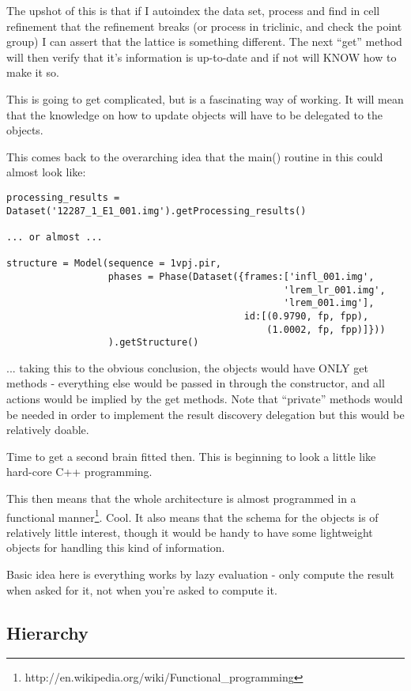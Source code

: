 \documentclass[a4paper, 11pt]{article}
\begin{document}
The upshot of this is that if I autoindex the data set, process and find in 
cell refinement that the refinement breaks (or process in triclinic, and
check the point group) I can assert that the lattice is something different.
The next ``get'' method will then verify that it's information is up-to-date
and if not will KNOW how to make it so.

This is going to get complicated, but is a fascinating way of working. 
It will mean that the knowledge on how to update objects will have to be
delegated to the objects.

This comes back to the overarching idea that the main() routine in this 
could almost look like:

{
\tiny
\begin{verbatim}
processing_results = Dataset('12287_1_E1_001.img').getProcessing_results()

... or almost ...

structure = Model(sequence = 1vpj.pir,
                  phases = Phase(Dataset({frames:['infl_001.img', 
                                                 'lrem_lr_001.img',
                                                 'lrem_001.img'],
                                          id:[(0.9790, fp, fpp),
                                              (1.0002, fp, fpp)]}))
                  ).getStructure()
\end{verbatim}
}

... taking this to the obvious conclusion, the objects would have ONLY get 
methods - everything else would be passed in through the constructor, and all
actions would be implied by the get methods. Note that ``private'' methods 
would be needed in order to implement the result discovery delegation but
this would be relatively doable.

Time to get a second brain fitted then. This is beginning to look a little 
like hard-core C++ programming.

This then means that the whole architecture is almost programmed in a 
functional 
manner\footnote{http://en.wikipedia.org/wiki/Functional\_programming}. 
Cool. It also means that the schema for the objects is
of relatively little interest, though it would be handy to have some 
lightweight objects for handling this kind of information.

Basic idea here is everything works by lazy evaluation - only compute the
result when asked for it, not when you're asked to compute it.

\subsection{Hierarchy}
\end{document}
